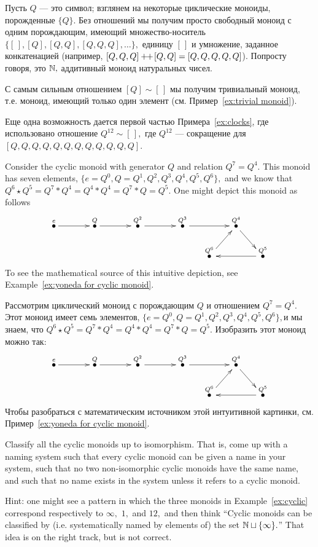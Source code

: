 \documentclass[../main/CT4S-EN-RU]{subfiles}
\begin{document}
\begin{exampleRUS}\label{ex:cyclic}
Пусть $Q$ — это символ; взглянем на некоторые циклические моноиды, порожденные $\{Q\}.$ Без отношений мы получим просто свободный моноид с одним порождающим, имеющий множество-носитель $\{[\,],[Q],[Q,Q],[Q,Q,Q],\ldots\},$ единицу $[\,]$ и умножение, заданное конкатенацией (например, $[Q,Q,Q]+\!\!+\hspace{1pt}[Q,Q]=[Q,Q,Q,Q,Q]$). Попросту говоря, это ${\mathbb N},$ аддитивный моноид натуральных чисел.

С самым сильным отношением $[Q]\sim[\,]$ мы получим тривиальный моноид, т.е. моноид, имеющий только один элемент (см. Пример~\ref{ex:trivial monoid}).

Еще одна возможность дается первой частью Примера~\ref{ex:clocks}, где использовано отношение $Q^{12}\sim[\,],$ где $Q^{12}$ — сокращение для $[Q,Q,Q,Q,Q,Q,Q,Q,Q,Q,Q,Q].$
\end{exampleRUS}

\begin{exampleENG}\label{ex:cyclic monoid (7,4)}
Consider the cyclic monoid with generator $Q$ and relation $Q^7=Q^4.$ This monoid has seven elements, $\{e=Q^0,Q=Q^1, Q^2, Q^3, Q^4, Q^5, Q^6\},$ and we know that $Q^6\star Q^5=Q^7*Q^4=Q^4*Q^4=Q^7*Q=Q^5.$ One might depict this monoid as follows
$$\xymatrix@=15pt{
\LMO{e}\ar[rr]&&\LMO{Q}\ar[rr]&&\LMO{Q^2}\ar[rr]&&\LMO{Q^3}\ar[rr]&&\LMO{Q^4}\ar[dr]\\
&&&&&&&\LMO{Q^6}\ar[ur]&&\LMO{Q^5}\ar[ll]
}
$$
To see the mathematical source of this intuitive depiction, see Example~\ref{ex:yoneda for cyclic monoid}.
\end{exampleENG}

\begin{exampleRUS}\label{ex:cyclic monoid (7,4)}
Рассмотрим циклический моноид с порождающим $Q$ и отношением $Q^7=Q^4.$ Этот моноид имеет семь элементов, $\{e=Q^0,Q=Q^1, Q^2, Q^3, Q^4, Q^5, Q^6\},$и мы знаем, что $Q^6\star Q^5=Q^7*Q^4=Q^4*Q^4=Q^7*Q=Q^5.$ Изобразить этот моноид можно так:
$$\xymatrix@=15pt{
\LMO{e}\ar[rr]&&\LMO{Q}\ar[rr]&&\LMO{Q^2}\ar[rr]&&\LMO{Q^3}\ar[rr]&&\LMO{Q^4}\ar[dr]\\
&&&&&&&\LMO{Q^6}\ar[ur]&&\LMO{Q^5}\ar[ll]
}
$$
Чтобы разобраться с математическим источником этой интуитивной картинки, см. Пример~\ref{ex:yoneda for cyclic monoid}.
\end{exampleRUS}

\begin{exerciseENG}\label{exc:classify cyclic}
Classify all the cyclic monoids up to isomorphism. That is, come up with a naming system such that every cyclic monoid can be given a name in your system, such that no two non-isomorphic cyclic monoids have the same name, and such that no name exists in the system unless it refers to a cyclic monoid.

Hint: one might see a pattern in which the three monoids in Example~\ref{ex:cyclic} correspond respectively to $\infty,$ $1,$ and $12,$ and then think “Cyclic monoids can be classified by (i.e. systematically named by elements of) the set ${\mathbb N}\sqcup\{\infty\}.$” That idea is on the right track, but is not correct.
\end{exerciseENG}
\end{document}
